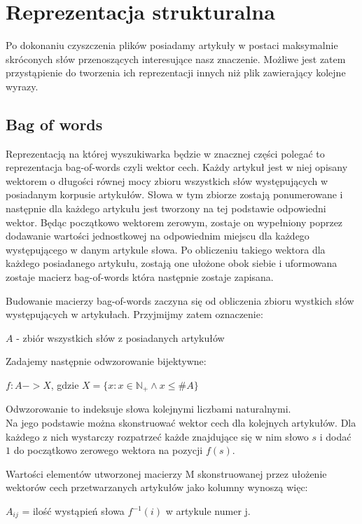 \section{Reprezentacja strukturalna}
Po dokonaniu czyszczenia plików posiadamy artykuły w postaci maksymalnie skróconych słów przenoszących interesujące nasz znaczenie. Możliwe jest zatem przystąpienie do tworzenia ich reprezentacji innych niż plik zawierający kolejne wyrazy.
\subsection{Bag of words}
Reprezentacją na której wyszukiwarka będzie w znacznej części polegać to reprezentacja bag-of-words czyli wektor cech. Każdy artykuł jest w niej opisany wektorem o długości równej mocy zbioru wszystkich słów występujących w posiadanym korpusie artykułów. Słowa w tym zbiorze zostają ponumerowane i następnie dla każdego artykułu jest tworzony na tej podstawie odpowiedni wektor. Będąc początkowo wektorem zerowym, zostaje on wypełniony poprzez dodawanie wartości jednostkowej na odpowiednim miejscu dla każdego występującego w danym artykule słowa. Po obliczeniu takiego wektora dla każdego posiadanego artykułu, zostają one ułożone obok siebie i uformowana zostaje macierz bag-of-words która następnie zostaje zapisana.

Budowanie macierzy bag-of-words zaczyna się od obliczenia zbioru wystkich słów występujących w artykułach.
Przyjmijmy zatem oznaczenie:
\begin{center}
$A$ - zbiór wszystkich słów z posiadanych artykułów
\end{center}

Zadajemy następnie odwzorowanie bijektywne:
\begin{center}
$f:A->X$, gdzie $X = \{ x: x \in \mathbb{N}_{+} \land x \leq \#A \} $
\end{center}
Odwzorowanie to indeksuje słowa kolejnymi liczbami naturalnymi.\\ 
Na jego podstawie można skonstruować wektor cech dla kolejnych artykułów. Dla każdego z nich wystarczy rozpatrzeć każde znajdujące się w nim słowo $s$ i dodać $1$ do początkowo zerowego wektora na pozycji $f(s)$.

Wartości elementów utworzonej macierzy M skonstruowanej przez ułożenie wektorów cech przetwarzanych artykułów jako kolumny wynoszą więc:
\begin{center}
$A_{ij}$ = ilość wystąpień słowa $f^{-1}(i)$ w artykule numer j.
\end{center}

